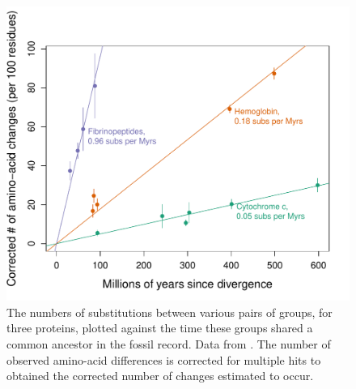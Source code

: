 \begin{figure}
\begin{center}
\includegraphics[width=0.8 \textwidth]{Journal_figs/genetic_drift/Molecular_clock_Dickerson/Dickerson_1979_mole_clock_fig.pdf}
\end{center}
\caption{The numbers of substitutions between various pairs of groups, for three proteins, plotted against the time these groups shared a common ancestor in the fossil record. Data from  \citet{dickerson1971structure}. The number of observed amino-acid differences is corrected for multiple hits to obtained the corrected number of changes estimated to occur. } \label{fig:Dickerson_mole_clock}  
\end{figure}


